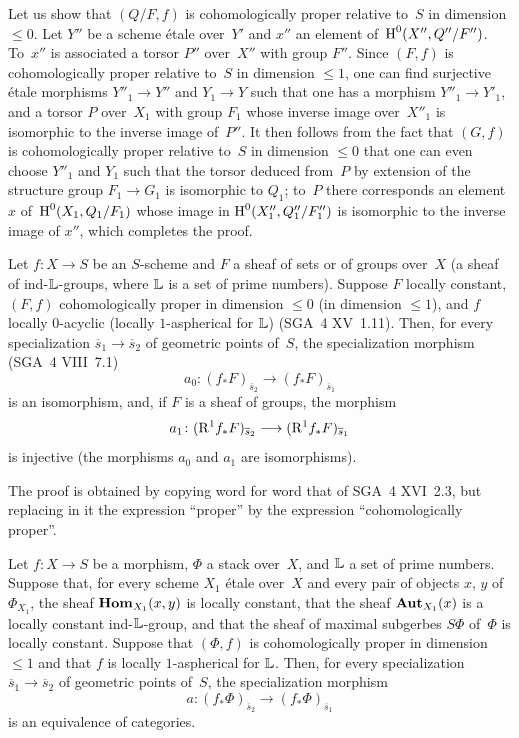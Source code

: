 Let us show that $(Q/F,f)$ is cohomologically proper relative to~$S$ in dimension $\leqslant 0$. Let $Y''$ be a scheme \'etale
over~$Y'$ and $x''$ an element of~$\operatorname{H}^0(X'',Q''/F'')$. To~$x''$
is associated a torsor $P''$ over~$X''$ with group $F''$. Since
$(F,f)$ is cohomologically proper relative to~$S$ in
dimension $\leqslant 1$, one can find surjective \'etale
morphisms $Y''_1 \to Y''$ and $Y_1 \to Y$ such that one has a
morphism $Y''_1 \to Y'_1$, and a torsor $P$ over~$X_1$ with group
$F_1$ whose inverse image over~$X''_1$ is isomorphic to the inverse
image of~$P''$. It then follows from the fact that $(G,f)$ is
cohomologically proper relative to~$S$ in dimension
$\leqslant 0$ that one can even choose $Y''_1$ and $Y_1$ such that
the torsor deduced from~$P$ by extension of the structure group $F_1
\to G_1$ is isomorphic to $Q_1$; to~$P$ there corresponds an
element $x$ of~$\operatorname{H}^0(X_1,Q_1/F_1)$ whose image in
$\operatorname{H}^0(X''_1,Q''_1/F''_1)$ is isomorphic to the inverse image of
$x''$, which completes the proof.

\begin{proposition}
\label{XIII.1.14}
Let $f \colon X \to S$ be an $S$-scheme and $F$ a sheaf
of sets or of groups over~$X$ (\resp a sheaf of
ind-$\mathbb{L}$-groups, where $\mathbb{L}$ is a set of prime
numbers). Suppose $F$ locally constant, $(F,f)$
cohomologically proper in dimension $\leqslant 0$ (\resp in
dimension $\leqslant 1$), and $f$ locally $0$-acyclic
(\resp locally $1$-aspherical for $\mathbb{L}$) \textup{(SGA~4 XV~1.11)}.
Then, for every specialization $\overline{s}_1 \to
\overline{s}_2$ of geometric points of~$S$, the
specialization morphism \textup{(SGA~4 VIII~7.1)}
$$
a_0 \colon (f_* F)_{\overline{s}_2} \to (f_*
F)_{\overline{s}_1}
$$
is an isomorphism, and, if $F$ is a sheaf of groups, the
morphism
$$
a_1 \colon (\R^1 f_* F)_{\overline{s}_2} \to (\R^1 f_*
F)_{\overline{s}_1}
$$
is injective (\resp the morphisms $a_0$ and $a_1$ are
isomorphisms).
\end{proposition}

The
proof is obtained by copying word for word that of SGA~4
XVI~2.3, but replacing in it the expression ``proper'' by
the expression ``cohomologically proper''.

\begin{corollary}
\label{XIII.1.15}
Let $f \colon X \to S$ be a morphism, $\Phi$ a stack over~$X$, and $\mathbb{L}$
a set of prime numbers. Suppose that, for every scheme
$X_1$ \'etale over~$X$ and every pair of objects $x$, $y$ of
$\Phi_{X_1}$, the sheaf $\operatorname{\mathbf{Hom}}_{X_1}(x,y)$ is locally
constant, that the sheaf $\operatorname{\mathbf{Aut}}_{X_1}(x)$ is a locally constant
ind-$\mathbb{L}$-group, and that the sheaf of
maximal subgerbes $S\Phi$ of~$\Phi$ \textup{\cite[III 2.1.7]{XIII.1}} is locally
constant. Suppose that $(\Phi,f)$ is cohomologically proper in
dimension $\leqslant 1$ and that $f$ is locally $1$-aspherical
for $\mathbb{L}$. Then, for every specialization $\overline{s}_1 \to
\overline{s}_2$ of geometric points of~$S$, the
specialization morphism
$$
a \colon (f_* \Phi)_{\overline{s}_2} \to (f_*
\Phi)_{\overline{s}_1}
$$
is an equivalence of categories.
\end{corollary}

